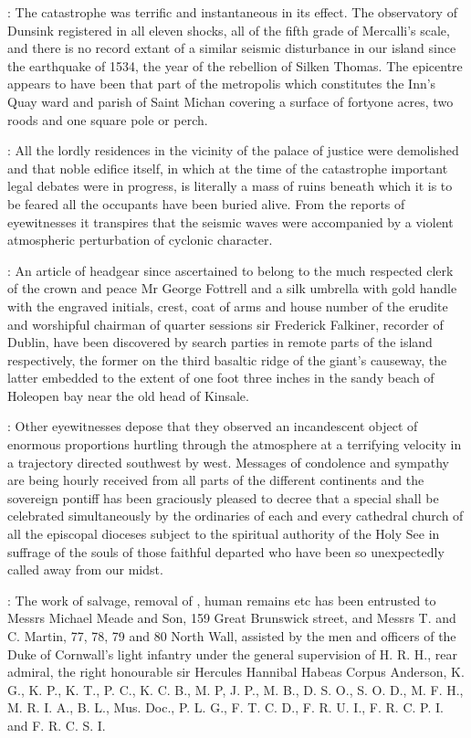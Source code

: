 :
The catastrophe was terrific and instantaneous in its effect. The
observatory of Dunsink registered in all eleven shocks, all of the fifth
grade of Mercalli's scale,
and there is no record extant of a similar
seismic disturbance in our island since the earthquake of 1534, the
year of the rebellion of Silken Thomas. The epicentre appears to have
been that part of the metropolis which constitutes the Inn's Quay
ward and parish of Saint Michan covering a surface of fortyone acres,
two roods and one square pole or perch.

:
All the lordly residences in
the vicinity of the palace of justice were demolished and that noble
edifice itself, in which at the time of the catastrophe important
legal debates were in progress, is literally a mass of ruins beneath
which it is to be feared all the occupants have been buried alive.
From the reports of eyewitnesses it transpires that the seismic waves
were accompanied
by a violent atmospheric perturbation of cyclonic
character.

:
An article of headgear since ascertained to belong to the much
respected clerk of the crown and peace Mr George Fottrell and a silk
umbrella with gold handle with the engraved initials, crest, coat of arms
and house number of the erudite and worshipful chairman of quarter
sessions sir Frederick Falkiner, recorder of Dublin, have been discovered
by search parties in remote parts of the island respectively, the former
on the third basaltic ridge of the giant's causeway, the latter embedded
to the extent of one foot three inches in the sandy beach of Holeopen
bay near the old head of Kinsale.

:
Other eyewitnesses depose that they
observed an incandescent object of enormous proportions
hurtling through
the atmosphere at a terrifying velocity in a trajectory directed
southwest by west. Messages of condolence and sympathy are being
hourly received from all parts of the different continents and the
sovereign pontiff has been graciously pleased to decree that a
special  shall be celebrated simultaneously by
the ordinaries of each and every cathedral church of all the episcopal
dioceses subject to the spiritual authority of the Holy See in suffrage of
the souls of those faithful departed who have been so unexpectedly called
away from our midst.

:
The work of salvage, removal of ,
human remains etc has been entrusted to Messrs Michael Meade and Son, 159 Great
Brunswick street,
and Messrs T. and C. Martin, 77, 78, 79 and 80 North
Wall, assisted by the men and officers of the Duke of Cornwall's light
infantry under the general supervision of H. R. H., rear admiral, the
right honourable sir Hercules Hannibal Habeas Corpus Anderson, K. G.,
K. P., K. T., P. C., K. C. B., M. P, J. P., M. B., D. S. O., S. O. D.,
M. F. H., M. R. I. A., B. L., Mus. Doc., P. L. G., F. T. C. D.,
F. R. U. I., F. R. C. P. I. and F. R. C. S. I.

